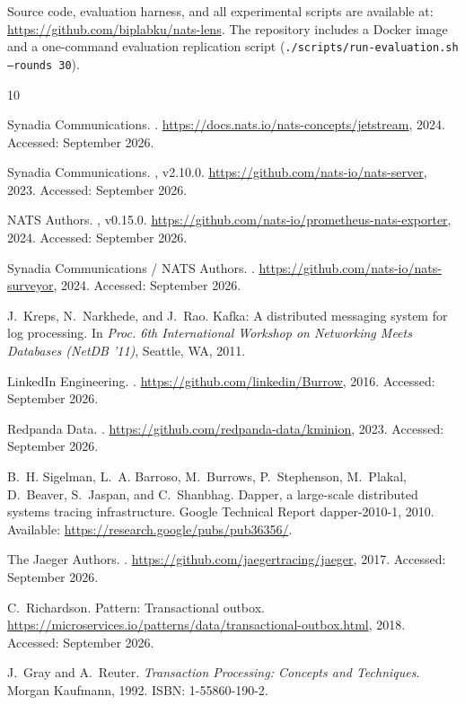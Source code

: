 \documentclass[sigconf,nonacm]{acmart}
\begin{document}
Source code, evaluation harness, and all experimental scripts are available at:
\url{https://github.com/biplabku/nats-lens}. The repository includes a Docker
image and a one-command evaluation replication script
(\texttt{./scripts/run-evaluation.sh --rounds 30}).

\begin{thebibliography}{10}

Synadia Communications.
.
\newblock \url{https://docs.nats.io/nats-concepts/jetstream}, 2024.
\newblock Accessed: September 2026.

Synadia Communications.
, v2.10.0.
\newblock \url{https://github.com/nats-io/nats-server}, 2023.
\newblock Accessed: September 2026.

{NATS Authors}.
, v0.15.0.
\newblock \url{https://github.com/nats-io/prometheus-nats-exporter}, 2024.
\newblock Accessed: September 2026.

{Synadia Communications / NATS Authors}.
.
\newblock \url{https://github.com/nats-io/nats-surveyor}, 2024.
\newblock Accessed: September 2026.

J.~Kreps, N.~Narkhede, and J.~Rao.
\newblock Kafka: A distributed messaging system for log processing.
\newblock In \emph{Proc. 6th International Workshop on Networking Meets
  Databases (NetDB '11)}, Seattle, WA, 2011.

{LinkedIn Engineering}.
.
\newblock \url{https://github.com/linkedin/Burrow}, 2016.
\newblock Accessed: September 2026.

{Redpanda Data}.
.
\newblock \url{https://github.com/redpanda-data/kminion}, 2023.
\newblock Accessed: September 2026.

B.~H. Sigelman, L.~A. Barroso, M.~Burrows, P.~Stephenson, M.~Plakal,
  D.~Beaver, S.~Jaspan, and C.~Shanbhag.
\newblock Dapper, a large-scale distributed systems tracing infrastructure.
\newblock Google Technical Report dapper-2010-1, 2010.
\newblock Available: \url{https://research.google/pubs/pub36356/}.

{The Jaeger Authors}.
.
\newblock \url{https://github.com/jaegertracing/jaeger}, 2017.
\newblock Accessed: September 2026.

C.~Richardson.
\newblock Pattern: Transactional outbox.
\newblock \url{https://microservices.io/patterns/data/transactional-outbox.html},
  2018.
\newblock Accessed: September 2026.

J.~Gray and A.~Reuter.
\newblock \emph{Transaction Processing: Concepts and Techniques}.
\newblock Morgan Kaufmann, 1992.
\newblock ISBN: 1-55860-190-2.

\end{thebibliography}
\end{document}
